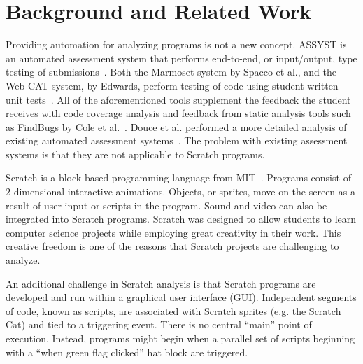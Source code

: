 \section{Background and Related Work}

Providing automation for analyzing programs is not a new concept.  ASSYST is an
automated assessment system that performs end-to-end, or input/output, type
testing of submissions~\cite{Jackson:1997:GSP:268084.268210}. Both the Marmoset
system by Spacco et al., and the Web-CAT system, by Edwards, perform testing of
code using student written unit tests~\cite{Spacco:2006:EMD:1140124.1140131,
  Edwards:2003:RCS:949344.949390}. All of the aforementioned tools supplement
the feedback the student receives with code coverage analysis and feedback from
static analysis tools such as FindBugs by Cole et
al.~\cite{Cole:2006:IYS:1176617.1176667}. Douce et al. performed a more
detailed analysis of existing automated assessment
systems~\cite{Douce:2005:ATA:1163405.1163409}.  The problem with existing
assessment systems is that they are not applicable to Scratch programs.

Scratch is a block-based programming language from MIT~\cite{ScratchTOCE2010}.
Programs consist of 2-dimensional interactive animations.  Objects, or sprites,
move on the screen as a result of user input or scripts in the program.  Sound
and video can also be integrated into Scratch programs.  Scratch was designed
to allow students to learn computer science projects while employing great
creativity in their work.  This creative freedom is one of the reasons that
Scratch projects are challenging to analyze.

An additional challenge in Scratch analysis is that Scratch programs are
developed and run within a graphical user interface (GUI).  Independent
segments of code, known as scripts, are associated with Scratch sprites
(e.g. the Scratch Cat) and tied to a triggering event.  There is no central
``main'' point of execution.  Instead, programs might begin when a parallel set
of scripts beginning with a ``when green flag clicked'' hat block are
triggered.

